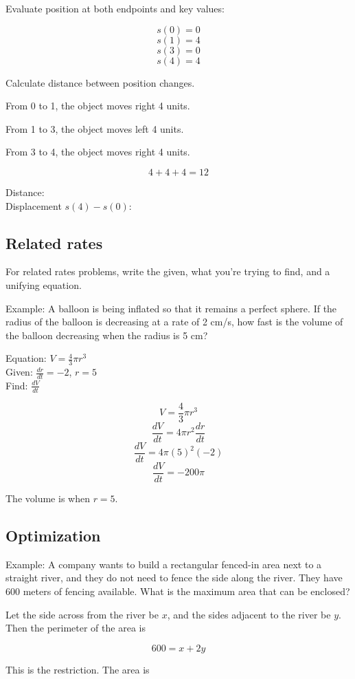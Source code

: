 \documentclass[letterpaper, 12pt]{article}
\begin{document}
Evaluate position at both endpoints and key values:

$$s(0) = 0$$
$$s(1) = 4$$
$$s(3) = 0$$
$$s(4) = 4$$

Calculate distance between position changes.

From 0 to 1, the object moves right 4 units.

From 1 to 3, the object moves left 4 units. 

From 3 to 4, the object moves right 4 units.

$$4+4+4 = 12$$

Distance:  \\
Displacement $s(4) - s(0)$: 

\subsection*{Related rates}
For related rates problems, write the given, what you're trying to find, and a unifying equation.

Example: A balloon is being inflated so that it remains a perfect sphere. If the radius of the balloon is decreasing at a rate of 2 cm/s, how fast is the volume of the balloon decreasing when the radius is 5 cm?

Equation: $ \displaystyle V = \frac{4}{3} \pi r^3 $ \\
Given: $ \displaystyle \frac{dr}{dt} = -2$, $r = 5$ \\
Find: $\displaystyle \frac{dV}{dt}$

$$ V = \frac{4}{3} \pi r^3 $$
$$ \frac{dV}{dt} = 4 \pi r^2 \frac{dr}{dt}$$
$$ \frac{dV}{dt} = 4 \pi (5)^2 (-2)$$
$$ \frac{dV}{dt} = -200 \pi$$

The volume is  when $r = 5$.

\subsection*{Optimization}
Example: A company wants to build a rectangular fenced-in area next to a straight river, and they do not need to fence the side along the river. They have 600 meters of fencing available. What is the maximum area that can be enclosed?

Let the side across from the river be $x$, and the sides adjacent to the river be $y$. Then the perimeter of the area is

$$ 600 = x + 2y$$

This is the restriction. The area is
\end{document}
